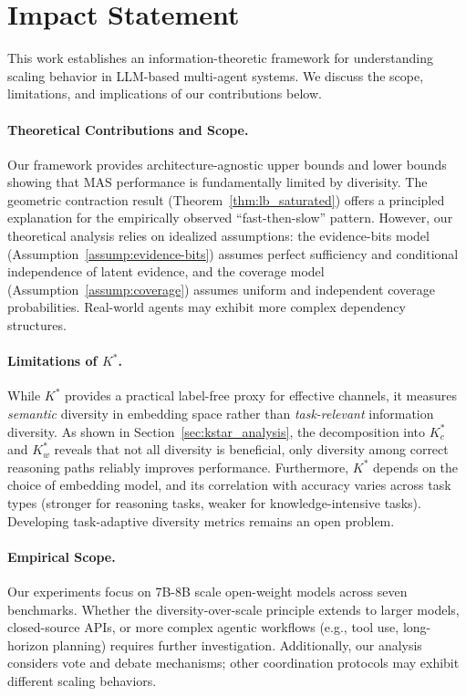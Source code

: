 \documentclass{article}
\theoremstyle{plain}
\theoremstyle{definition}
\theoremstyle{remark}
\begin{document}
\newpage
\section*{Impact Statement}
This work establishes an information-theoretic framework for understanding scaling behavior in LLM-based multi-agent systems. We discuss the scope, limitations, and implications of our contributions below.
\vspace{-0.2cm}
\paragraph{Theoretical Contributions and Scope.}
Our framework provides architecture-agnostic upper bounds and lower bounds showing that MAS performance is fundamentally limited by diverisity. The geometric contraction result (Theorem~\ref{thm:lb_saturated}) offers a principled explanation for the empirically observed ``fast-then-slow'' pattern. However, our theoretical analysis relies on idealized assumptions: the evidence-bits model (Assumption~\ref{assump:evidence-bits}) assumes perfect sufficiency and conditional independence of latent evidence, and the coverage model (Assumption~\ref{assump:coverage}) assumes uniform and independent coverage probabilities. Real-world agents may exhibit more complex dependency structures.

\vspace{-0.2cm}
\paragraph{Limitations of $K^*$.}
While $K^*$ provides a practical label-free proxy for effective channels, it measures \emph{semantic} diversity in embedding space rather than \emph{task-relevant} information diversity. As shown in Section~\ref{sec:kstar_analysis}, the decomposition into $K^*_c$ and $K^*_w$ reveals that not all diversity is beneficial, only diversity among correct reasoning paths reliably improves performance. Furthermore, $K^*$ depends on the choice of embedding model, and its correlation with accuracy varies across task types (stronger for reasoning tasks, weaker for knowledge-intensive tasks). Developing task-adaptive diversity metrics remains an open problem.

\vspace{-0.2cm}
\paragraph{Empirical Scope.}
Our experiments focus on 7B-8B scale open-weight models across seven benchmarks. Whether the diversity-over-scale principle extends to larger models, closed-source APIs, or more complex agentic workflows (e.g., tool use, long-horizon planning) requires further investigation. Additionally, our analysis considers vote and debate mechanisms; other coordination protocols may exhibit different scaling behaviors.
\end{document}

